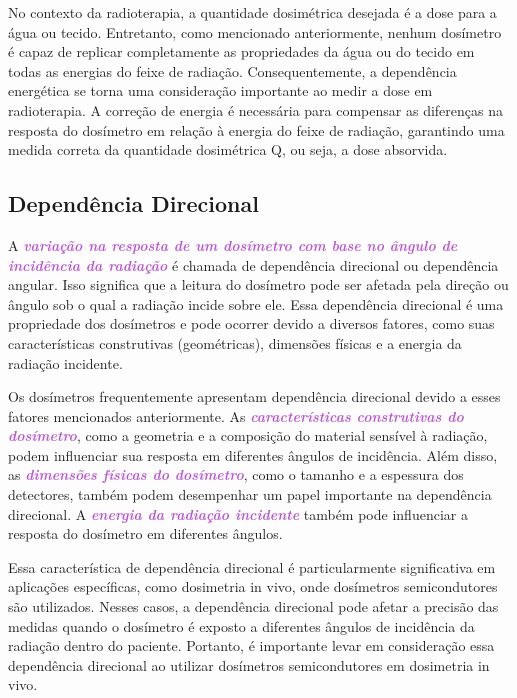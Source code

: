 \documentclass[11pt,a4paper]{article}
\begin{document}
	No contexto da radioterapia, a quantidade dosimétrica desejada é a dose para a água ou tecido. Entretanto, como mencionado anteriormente, nenhum dosímetro é capaz de replicar completamente as propriedades da água ou do tecido em todas as energias do feixe de radiação. Consequentemente, a dependência energética se torna uma consideração importante ao medir a dose em radioterapia. A correção de energia é necessária para compensar as diferenças na resposta do dosímetro em relação à energia do feixe de radiação, garantindo uma medida correta da quantidade dosimétrica Q, ou seja, a dose absorvida.

\subsection*{Dependência Direcional}

	A \textcolor{MediumOrchid}{\textit{\textbf{variação na resposta de um dosímetro com base no ângulo de incidência da radiação}}} é chamada de dependência direcional ou dependência angular. Isso significa que a leitura do dosímetro pode ser afetada pela direção ou ângulo sob o qual a radiação incide sobre ele. Essa dependência direcional é uma propriedade dos dosímetros e pode ocorrer devido a diversos fatores, como suas características construtivas (geométricas), dimensões físicas e a energia da radiação incidente.

	Os dosímetros frequentemente apresentam dependência direcional devido a esses fatores mencionados anteriormente. As \textcolor{MediumOrchid}{\textit{\textbf{características construtivas do dosímetro}}}, como a geometria e a composição do material sensível à radiação, podem influenciar sua resposta em diferentes ângulos de incidência. Além disso, as \textcolor{MediumOrchid}{\textit{\textbf{dimensões físicas do dosímetro}}}, como o tamanho e a espessura dos detectores, também podem desempenhar um papel importante na dependência direcional. A \textcolor{MediumOrchid}{\textit{\textbf{energia da radiação incidente}}} também pode influenciar a resposta do dosímetro em diferentes ângulos.

	Essa característica de dependência direcional é particularmente significativa em aplicações específicas, como dosimetria in vivo, onde dosímetros semicondutores são utilizados. Nesses casos, a dependência direcional pode afetar a precisão das medidas quando o dosímetro é exposto a diferentes ângulos de incidência da radiação dentro do paciente. Portanto, é importante levar em consideração essa dependência direcional ao utilizar dosímetros semicondutores em dosimetria in vivo.
\end{document}
